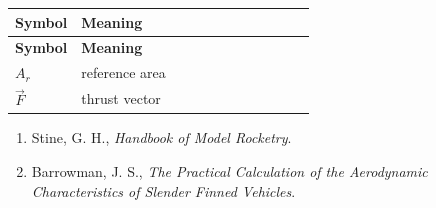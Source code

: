\label{smoke:sec:symbols}
\begin{longtable}{@{}l p{0.78\linewidth}@{}}
\toprule \textbf{Symbol} & \textbf{Meaning} \\ \midrule \endfirsthead
\toprule \textbf{Symbol} & \textbf{Meaning} \\ \midrule \endhead
\bottomrule \endlastfoot
$A_r$ & reference area \\
$\vec{F}$ & thrust vector \\
\end{longtable}
\label{smoke:sec:refs}
\begin{enumerate}[label=\arabic*.,ref=\arabic*,leftmargin=*]
  \item\label{smoke:ref:1} Stine, G. H., \emph{Handbook of Model Rocketry}.
  \item\label{smoke:ref:2} Barrowman, J. S., \emph{The Practical Calculation of the Aerodynamic Characteristics of Slender Finned Vehicles}.
\end{enumerate}
